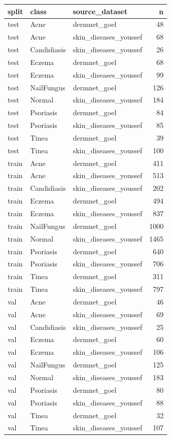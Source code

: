 \begin{tabular}{lllr}
\toprule
split & class & source\_dataset & n \\
\midrule
test & Acne & dermnet\_goel & 48 \\
test & Acne & skin\_diseases\_youssef & 68 \\
test & Candidiasis & skin\_diseases\_youssef & 26 \\
test & Eczema & dermnet\_goel & 68 \\
test & Eczema & skin\_diseases\_youssef & 99 \\
test & NailFungus & dermnet\_goel & 126 \\
test & Normal & skin\_diseases\_youssef & 184 \\
test & Psoriasis & dermnet\_goel & 84 \\
test & Psoriasis & skin\_diseases\_youssef & 85 \\
test & Tinea & dermnet\_goel & 39 \\
test & Tinea & skin\_diseases\_youssef & 100 \\
train & Acne & dermnet\_goel & 411 \\
train & Acne & skin\_diseases\_youssef & 513 \\
train & Candidiasis & skin\_diseases\_youssef & 202 \\
train & Eczema & dermnet\_goel & 494 \\
train & Eczema & skin\_diseases\_youssef & 837 \\
train & NailFungus & dermnet\_goel & 1000 \\
train & Normal & skin\_diseases\_youssef & 1465 \\
train & Psoriasis & dermnet\_goel & 640 \\
train & Psoriasis & skin\_diseases\_youssef & 706 \\
train & Tinea & dermnet\_goel & 311 \\
train & Tinea & skin\_diseases\_youssef & 797 \\
val & Acne & dermnet\_goel & 46 \\
val & Acne & skin\_diseases\_youssef & 69 \\
val & Candidiasis & skin\_diseases\_youssef & 25 \\
val & Eczema & dermnet\_goel & 60 \\
val & Eczema & skin\_diseases\_youssef & 106 \\
val & NailFungus & dermnet\_goel & 125 \\
val & Normal & skin\_diseases\_youssef & 183 \\
val & Psoriasis & dermnet\_goel & 80 \\
val & Psoriasis & skin\_diseases\_youssef & 88 \\
val & Tinea & dermnet\_goel & 32 \\
val & Tinea & skin\_diseases\_youssef & 107 \\
\bottomrule
\end{tabular}
